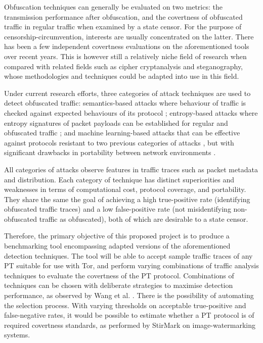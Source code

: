 \documentclass[11pt]{article}
\begin{document}
Obfuscation techniques can generally be evaluated on two metrics: the transmission performance after obfuscation, and the covertness of obfuscated traffic in regular traffic when examined by a state censor. For the purpose of censorship-circumvention, interests are usually concentrated on the latter. There has been a few independent covertness evaluations on the aforementioned tools \cite{tan2015towards} \cite{houmansadr2013parrot} \cite{wang2015seeing} over recent years. This is however still a relatively niche field of research when compared with related fields such as cipher cryptanalysis and steganography, whose methodologies and techniques could be adapted into use in this field.

Under current research efforts, three categories of attack techniques are used to detect obfuscated traffic: semantics-based attacks where behaviour of traffic is checked against expected behaviours of its protocol \cite[Sec. VIII]{houmansadr2013parrot} \cite[Sec. 4]{wang2015seeing}; entropy-based attacks where entropy signatures of packet payloads can be established for regular and obfuscated traffic \cite{tan2015towards} \cite[Sec. 5]{wang2015seeing}; and machine learning-based attacks that can be effective against protocols resistant to two previous categories of attacks \cite[Sec. 6]{wang2015seeing}, but with significant drawbacks in portability between network environments \cite{dixon2016network}. 

All categories of attacks observe features in traffic traces such as packet metadata and distribution. Each category of technique has distinct superiorities and weaknesses in terms of computational cost, protocol coverage, and portability. They share the same the goal of achieving a high true-positive rate (identifying obfuscated traffic traces) and a low false-positive rate (not misidentifying non-obfuscated traffic as obfuscated), both of which are desirable to a state censor. 

Therefore, the primary objective of this proposed project is to produce a benchmarking tool encompassing adapted versions of the aforementioned detection techniques. The tool will be able to accept sample traffic traces of any PT suitable for use with Tor, and perform varying combinations of traffic analysis techniques to evaluate the covertness of the PT protocol. Combinations of techniques can be chosen with deliberate strategies to maximise detection performance, as observed by Wang et al. \cite[Sec. 5.2]{wang2015seeing}. There is the possibility of automating the selection process. With varying thresholds on acceptable true-positive and false-negative rates, it would be possible to estimate whether a PT protocol is of required covertness standards, as performed by StirMark \cite{petitcolas1998attacks} on image-watermarking systems.
\end{document}
